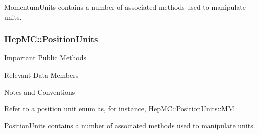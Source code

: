 \documentclass[11pt,letterpaper]{article}
\begin{document}
MomentumUnits contains a number of associated methods used to
manipulate units.

%
%

\subsubsection{HepMC::PositionUnits}
\begin{myitemize}{Important Public Methods}
\end{myitemize}
\begin{myitemize}{Relevant Data Members}
\end{myitemize}
\begin{myitemize}{Notes and Conventions}
  \item Refer to a position unit enum as, for instance,
    HepMC::PositionUnits::MM
\end{myitemize}

PositionUnits contains a number of associated methods used to
manipulate units.

%
%
\end{document}
